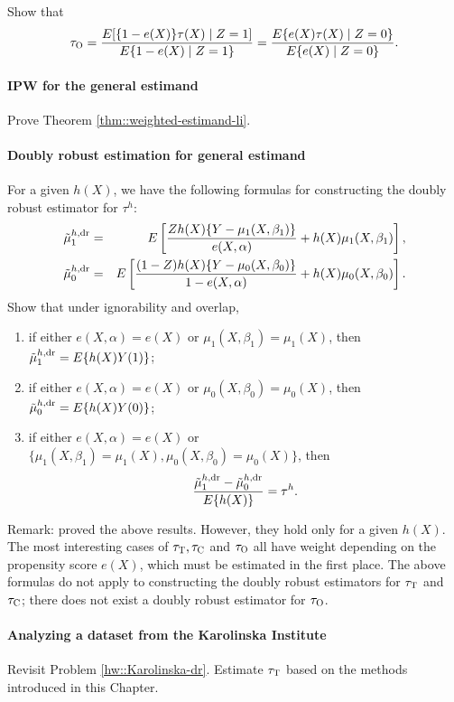 Show that
$$
\tau_\textsc{O} 
=  \frac{   E  [   \{1-e(X)\} \tau(X) \mid Z=1   ]      }{  E  \{ 1-e(X) \mid Z=1   \}   }
=  \frac{   E  \{ e(X) \tau(X) \mid Z=0   \}      }{  E  \{ e(X) \mid Z=0   \}   }.
$$



\paragraph{IPW for the general estimand}\label{problem::general-estimand-li}

Prove Theorem \ref{thm::weighted-estimand-li}. 


\paragraph{Doubly robust estimation for general estimand}\label{problem::general-estimand-dr}


For a given $h(X)$, we have the following formulas for constructing the doubly robust estimator for $\tau^h$: 
\begin{eqnarray*}
\tilde{\mu}_1^{h,\textup{dr}} &=& E\left[   \frac{Zh(X)  \{ Y-\mu_1(X,\beta_1)   \}}{  e(X,\alpha) }   + h(X) \mu_1(X, \beta_1)  \right] ,  \\
\tilde{\mu}_0^{h, \textup{dr}} &=& E\left[   \frac{(1-Z) h(X)  \{ Y-\mu_0(X,\beta_0) \}}{  1-e(X,\alpha) }   + h(X) \mu_0(X, \beta_0)  \right]  .  
\end{eqnarray*}
Show that under ignorability and overlap,
\begin{enumerate}
\item
if either $e(X,\alpha) = e(X)$ or $\mu_1(X, \beta_1) = \mu_1(X)$, then $\tilde{\mu}_1^{h,\textup{dr}}= E\{  h(X)  Y(1) \}$;
\item
if either $e(X,\alpha) = e(X)$ or $\mu_0(X, \beta_0) = \mu_0(X)$, then $\tilde{\mu}_0^{h, \textup{dr}}= E\{ h(X)  Y(0) \}$;
\item 
if either $e(X,\alpha) = e(X)$ or $\{\mu_1(X, \beta_1) = \mu_1(X),   \mu_0(X, \beta_0) = \mu_0(X)\}$, then 
$$
\frac{\tilde{\mu}_1^{h,\textup{dr}}  -\tilde{\mu}_0^{h, \textup{dr}}  }{  E\{ h(X)  \}  }
= \tau^h .
$$
\end{enumerate}

Remark: 
\citet{tao2019doubly} proved the above results. However, they hold only for a  given $h(X)$. The most interesting cases of $\tau_\textsc{T}, \tau_\textsc{C}$ and $\tau_\textsc{O}$ all have weight depending on the propensity score $e(X)$, which must be estimated in the first place. The above formulas do not apply to constructing the doubly robust estimators for $\tau_\textsc{T}$ and $\tau_\textsc{C}$; there does not exist a doubly robust estimator for $\tau_\textsc{O}$.


\paragraph{Analyzing a dataset from the Karolinska Institute}\label{hw::Karolinska-att}

Revisit Problem \ref{hw::Karolinska-dr}. Estimate $\tau_\textsc{T}$ based on the methods introduced in this Chapter. 



